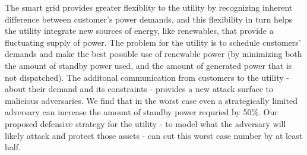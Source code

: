 \documentclass[conference]{IEEEtran}
\begin{document}
The smart grid provides greater flexiblity to the utility by recognizing inherent difference between customer's power demands, and this flexibility in turn helps the utility integrate new sources of energy, like renewables, that provide a fluctuating supply of power.  The problem for the utility is to schedule customers' demands and make the best possible use of renewable power (by minimizing both the amount of standby power used, and the amount of generated power that is not dispatched).  The additonal communication from customers to the utility - about their demand and its constraints - provides a new attack surface to malicious adversaries.  We find that in the worst case even a strategically limited adversary can increase the amount of standby power requried by 50\%.  Our proposed defensive strategy for the utility - to model what the adversary will likely attack and protect those assets - can cut this worst case number by at least half.

{\footnotesize


}
\end{document}
